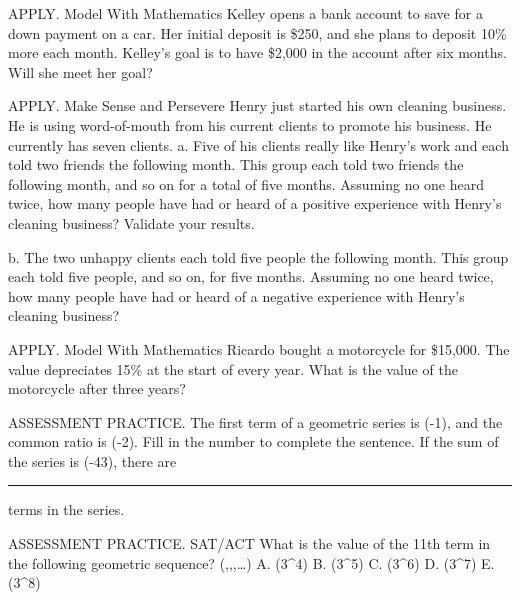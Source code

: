 \documentclass{article}
\newenvironment{practice}[2]{}{}        %
\newcommand{\answer}[1]{}               %
\newcommand{\placeholder}[2]{}          %
\begin{document}
\begin{practice}{38}{2}
APPLY. Model With Mathematics Kelley opens a bank account to save for a down payment on a car. Her initial deposit is \$250, and she plans to deposit 10\% more each month. Kelley's goal is to have \$2,000 in the account after six months. Will she meet her goal?
\answer{No, she will only have \$1,928.91 saved in the account.}
\end{practice}
\begin{practice}{39}{2}
APPLY. Make Sense and Persevere Henry just started his own cleaning business. He is using word-of-mouth from his current clients to promote his business. He currently has seven clients.
a. Five of his clients really like Henry's work and each told two friends the following month. This group each told two friends the following month, and so on for a total of five months. Assuming no one heard twice, how many people have had or heard of a positive experience with Henry's cleaning business? Validate your results.
\answer{155 people; summed the expression for 5 terms or months, that each happy person told 2 others about their experience.}
b. The two unhappy clients each told five people the following month. This group each told five people, and so on, for five months. Assuming no one heard twice, how many people have had or heard of a negative experience with Henry's cleaning business?
\answer{1,562 people}
\end{practice}
\begin{practice}{40}{2}
APPLY. Model With Mathematics Ricardo bought a motorcycle for \$15,000. The value depreciates 15\% at the start of every year. What is the value of the motorcycle after three years?
\placeholder{illustration}{Time/Value diagram with four rows labeled 0 Yr, 1 Yr, 2 Yr, 3 Yr. A red motorcycle appears in each row above a gray road; an expanding gold block covers increasing fractions of its image as time increases.}
\answer{\$9,211.88}
\end{practice}
\begin{practice}{41}{1}
ASSESSMENT PRACTICE. The first term of a geometric series is (-1), and the common ratio is (-2). Fill in the number to complete the sentence.
If the sum of the series is (-43), there are \rule{1cm}{0.4pt} terms in the series.
\answer{7}
\end{practice}
\begin{practice}{42}{1}
ASSESSMENT PRACTICE. SAT/ACT What is the value of the 11th term in the following geometric sequence?
(,,,\ldots)
A. (3^4)
B. (3^5)
C. (3^6)
D. (3^7)
E. (3^8)
\answer{D}
\end{practice}
\end{document}
